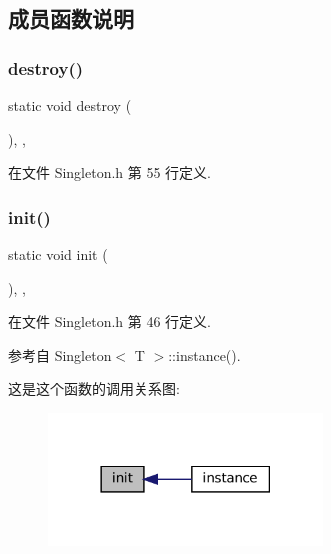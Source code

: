 \subsection{成员函数说明}
\mbox{\label{classmuduo_1_1Singleton_a112a068c3a6f373ec6c12fdf0b48987b}} 
\subsubsection{\texorpdfstring{destroy()}{destroy()}}
{\footnotesize\ttfamily static void destroy (\begin{DoxyParamCaption}{ }\end{DoxyParamCaption})\hspace{0.3cm}{\ttfamily [inline]}, {\ttfamily [static]}, {\ttfamily [private]}}



在文件 Singleton.\+h 第 55 行定义.

\mbox{\label{classmuduo_1_1Singleton_aedc913c139bb562646d3459b0ca28997}} 
\subsubsection{\texorpdfstring{init()}{init()}}
{\footnotesize\ttfamily static void init (\begin{DoxyParamCaption}{ }\end{DoxyParamCaption})\hspace{0.3cm}{\ttfamily [inline]}, {\ttfamily [static]}, {\ttfamily [private]}}



在文件 Singleton.\+h 第 46 行定义.



参考自 Singleton$<$ T $>$\+::instance().

这是这个函数的调用关系图\+:
\nopagebreak
\begin{figure}[H]
\begin{center}
\leavevmode
\includegraphics[width=206pt]{classmuduo_1_1Singleton_aedc913c139bb562646d3459b0ca28997_icgraph}
\end{center}
\end{figure}
\mbox{\label{classmuduo_1_1Singleton_a359703743cd890f1e3df60b6b06a5724}} 
